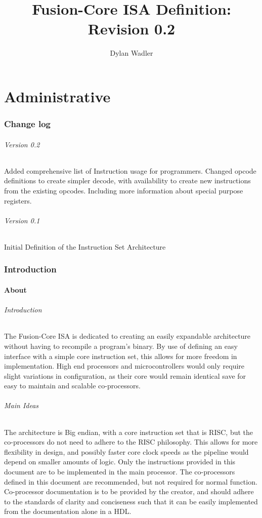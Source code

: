 \documentclass[letterpaper, 11pt]{article}
\title{Fusion-Core ISA Definition: Revision 0.2}
\author{Dylan Wadler}
\begin{document}
\maketitle
\newpage
\tableofcontents


\newpage
\part{Administrative}
\section{Change log}
\paragraph{Version 0.2} Added comprehensive list of Instruction usage for programmers. Changed opcode definitions to create simpler
decode, with availability to create new instructions from the existing opcodes. Including more information about special purpose registers.
\paragraph{Version 0.1} Initial Definition of the Instruction Set Architecture

\section{Introduction}

\subsection{About}
\paragraph{Introduction}The Fusion-Core ISA is dedicated to creating an easily expandable architecture without having to 
recompile a program's binary. By use of defining an easy interface with a simple core instruction set, this allows for
more freedom in implementation. High end processors and microcontrollers would only require slight variations in
configuration, as their core would remain identical save for easy to maintain and scalable co-processors.
\paragraph{Main Ideas}The architecture is Big endian, with a core instruction set that is RISC, but the co-processors do not need to adhere to the RISC philosophy. This allows for more flexibility in design, and possibly faster core clock speeds as the pipeline would depend on smaller amounts of logic. Only the instructions provided in this document are to be implemented in the main processor. The co-processors defined in this document are recommended, but not required for normal function. Co-processor documentation is to be provided by the creator, and should adhere to the standards of clarity and conciseness such that it can be easily implemented from the documentation alone in a HDL. 
\end{document}
